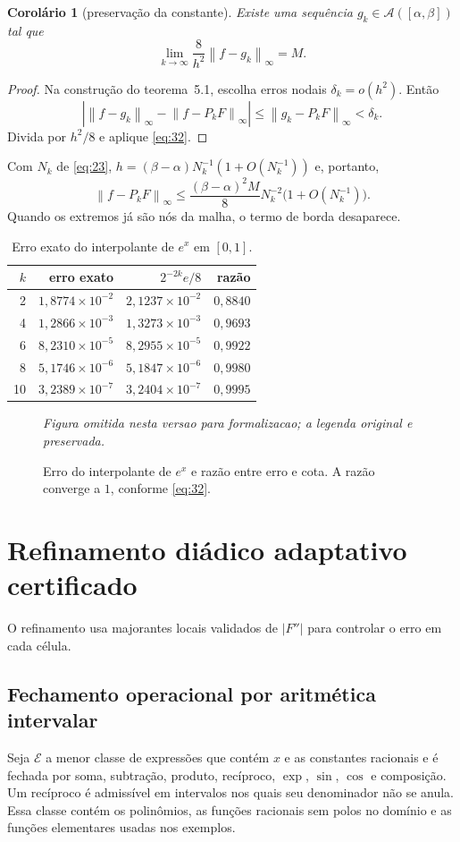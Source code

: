 \documentclass[11pt,a4paper]{article}
\theoremstyle{preciso}
\newtheorem{corolario}[teorema]{Corolário}
\theoremstyle{definition}
\newcommand{\Asm}{\mathcal A}
\newcommand{\EE}{\mathcal E}
\newcommand{\norm}[1]{\left\|#1\right\|_{\infty}}
\newcommand{\eqn}[2]{\begin{equation}\label{eq:#1}#2\end{equation}}
\newcommand{\figura}[4]{\begin{figure}[!htbp]\centering
 \emph{Figura omitida nesta versao para formalizacao; a legenda original e preservada.}
 \caption{#3}\label{fig:#4}\end{figure}}
\begin{document}
\begin{corolario}[preservação da constante]
Existe uma sequência $g_k\in\Asm([\alpha,\beta])$ tal que
\[
\lim_{k\to\infty}\frac8{h^2}\norm{f-g_k}=M.
\]
\end{corolario}
\begin{proof}
Na construção do teorema~5.1, escolha erros nodais $\delta_k=o(h^2)$. Então
\[
\left|\norm{f-g_k}-\norm{f-P_kF}\right|\le\norm{g_k-P_kF}<\delta_k.
\]
Divida por $h^2/8$ e aplique \eqref{eq:32}.
\end{proof}
Com $N_k$ de \eqref{eq:23}, $h=(\beta-\alpha)N_k^{-1}(1+O(N_k^{-1}))$ e, portanto,
\eqn{35}{\norm{f-P_kF}\le\frac{(\beta-\alpha)^2M}8N_k^{-2}\bigl(1+O(N_k^{-1})\bigr).}
Quando os extremos já são nós da malha, o termo de borda desaparece.
\begin{table}[!htbp]\centering
\caption{Erro exato do interpolante de $e^x$ em $[0,1]$.}
\begin{tabular}{rrrr}\toprule
$k$&erro exato&$2^{-2k}e/8$&razão\\\midrule
2&$1{,}8774\times10^{-2}$&$2{,}1237\times10^{-2}$&$0{,}8840$\\
4&$1{,}2866\times10^{-3}$&$1{,}3273\times10^{-3}$&$0{,}9693$\\
6&$8{,}2310\times10^{-5}$&$8{,}2955\times10^{-5}$&$0{,}9922$\\
8&$5{,}1746\times10^{-6}$&$5{,}1847\times10^{-6}$&$0{,}9980$\\
10&$3{,}2389\times10^{-7}$&$3{,}2404\times10^{-7}$&$0{,}9995$\\\bottomrule
\end{tabular}
\end{table}
\figura{05_taxa_exponencial}{.98}{Erro do interpolante de $e^x$ e razão entre erro e cota. A razão converge a $1$, conforme \eqref{eq:32}.}{taxa}



\section{Refinamento diádico adaptativo certificado}
O refinamento usa majorantes locais validados de $|F''|$ para controlar o erro em cada célula.

\subsection{Fechamento operacional por aritmética intervalar}
Seja $\EE$ a menor classe de expressões que contém $x$ e as constantes racionais e é fechada por soma, subtração, produto, recíproco, $\exp$, $\sin$, $\cos$ e composição. Um recíproco é admissível em intervalos nos quais seu denominador não se anula. Essa classe contém os polinômios, as funções racionais sem polos no domínio e as funções elementares usadas nos exemplos.
\end{document}
